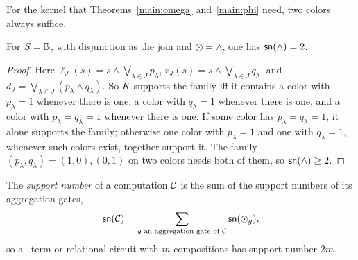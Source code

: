 For the kernel that Theorems~\ref{main:omega} and~\ref{main:phi} need, two
colors always suffice.
\begin{lemma}\label{lem:and-width}
For $S=\mathbb B$, with disjunction as the join and $\odot=\land$, one has
$\mathsf{sn}(\land)=2$.
\end{lemma}
\begin{proof}
Here $\ell_J(s)=s\land\bigvee_{\lambda\in J}p_\lambda$,
$r_J(s)=s\land\bigvee_{\lambda\in J}q_\lambda$, and
$d_J=\bigvee_{\lambda\in J}(p_\lambda\land q_\lambda)$. So $K$ supports the
family iff it contains a color with $p_\lambda=1$ whenever there is one, a
color with $q_\lambda=1$ whenever there is one, and a color with
$p_\lambda=q_\lambda=1$ whenever there is one. If some color has
$p_\lambda=q_\lambda=1$, it alone supports the family; otherwise one color
with $p_\lambda=1$ and one with $q_\lambda=1$, whenever such colors exist,
together support it. The family
$(p_\lambda,q_\lambda)=(1,0),(0,1)$ on two colors needs both of them, so
$\mathsf{sn}(\land)\ge2$.
\end{proof}
The \emph{support number} of a computation $\mathcal C$ is the sum of the
support numbers of its aggregation gates,
\[
 \mathsf{sn}(\mathcal C)=\sum_{g\text{ an aggregation gate of }\mathcal C}\mathsf{sn}(\odot_g),
\]
so a \CoR\ term or relational circuit with $m$ compositions has support
number $2m$.

